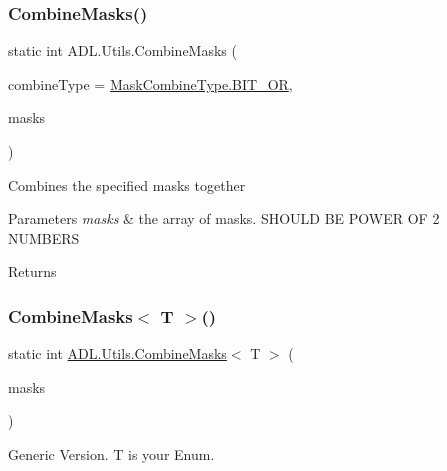 \subsubsection{\texorpdfstring{Combine\+Masks()}{CombineMasks()}}
{\footnotesize\ttfamily static int A\+D\+L.\+Utils.\+Combine\+Masks (\begin{DoxyParamCaption}\item[{\mbox{\hyperlink{namespace_a_d_l_a887d1db091d273083278875e32842128}{Mask\+Combine\+Type}}}]{combine\+Type = {\ttfamily \mbox{\hyperlink{namespace_a_d_l_a887d1db091d273083278875e32842128a377da01fa3eaa9e9d6a69a2fa415fe7b}{Mask\+Combine\+Type.\+B\+I\+T\+\_\+\+OR}}},  }\item[{params int \mbox{[}$\,$\mbox{]}}]{masks }\end{DoxyParamCaption})\hspace{0.3cm}{\ttfamily [static]}}



Combines the specified masks together 


\begin{DoxyParams}{Parameters}
{\em masks} & the array of masks. S\+H\+O\+U\+LD BE P\+O\+W\+ER OF 2 N\+U\+M\+B\+E\+RS\\
\hline
\end{DoxyParams}
\begin{DoxyReturn}{Returns}

\end{DoxyReturn}
\mbox{\label{class_a_d_l_1_1_utils_af62716f1f25f794bbd3212966610baed}} 
\subsubsection{\texorpdfstring{Combine\+Masks$<$ T $>$()}{CombineMasks< T >()}}
{\footnotesize\ttfamily static int \mbox{\hyperlink{class_a_d_l_1_1_utils_a75c77c4689775aca5a14e1e046e289fc}{A\+D\+L.\+Utils.\+Combine\+Masks}}$<$ T $>$ (\begin{DoxyParamCaption}\item[{params T \mbox{[}$\,$\mbox{]}}]{masks }\end{DoxyParamCaption})\hspace{0.3cm}{\ttfamily [static]}}



Generic Version. T is your Enum. 


